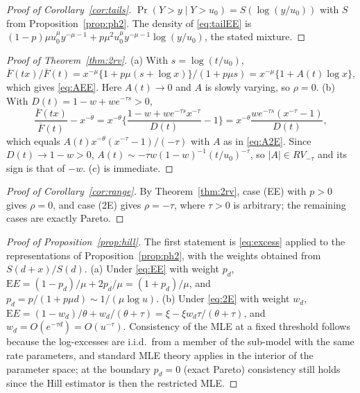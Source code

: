 \documentclass[12pt]{article}
\theoremstyle{definition}
\theoremstyle{remark}
\newcommand{\bF}{\overline{F}}
\newcommand{\E}{\mathrm{E}}
\begin{document}
\begin{proof}[Proof of Corollary~\ref{cor:tails}]
$\Pr(Y>y\mid Y>u_0)=S(\log(y/u_0))$ with $S$ from Proposition~\ref{prop:ph2}. The density of \eqref{eq:tailEE} is $(1-p)\mu u_0^{\mu}y^{-\mu-1}+p\mu^2u_0^{\mu}y^{-\mu-1}\log(y/u_0)$, the stated mixture.
\end{proof}

\begin{proof}[Proof of Theorem~\ref{thm:2rv}]
(a) With $s=\log(t/u_0)$, $\bF(tx)/\bF(t)=x^{-\mu}\{1+p\mu(s+\log x)\}/(1+p\mu s)=x^{-\mu}\{1+A(t)\log x\}$, which gives \eqref{eq:AEE}. Here $A(t)\to0$ and $A$ is slowly varying, so $\rho=0$.
(b) With $D(t)=1-w+we^{-\tau s}>0$,
\[
\frac{\bF(tx)}{\bF(t)}-x^{-\theta}=x^{-\theta}\Big\{\frac{1-w+we^{-\tau s}x^{-\tau}}{D(t)}-1\Big\}=x^{-\theta}\frac{we^{-\tau s}(x^{-\tau}-1)}{D(t)},
\]
which equals $A(t)x^{-\theta}(x^{-\tau}-1)/(-\tau)$ with $A$ as in \eqref{eq:A2E}. Since $D(t)\to1-w>0$, $A(t)\sim-\tau w(1-w)^{-1}(t/u_0)^{-\tau}$, so $|A|\in RV_{-\tau}$ and its sign is that of $-w$.
(c) is immediate.
\end{proof}

\begin{proof}[Proof of Corollary~\ref{cor:range}]
By Theorem~\ref{thm:2rv}, case (EE) with $p>0$ gives $\rho=0$, and case (2E) gives $\rho=-\tau$, where $\tau>0$ is arbitrary; the remaining cases are exactly Pareto.
\end{proof}

\begin{proof}[Proof of Proposition~\ref{prop:hill}]
The first statement is \eqref{eq:excess} applied to the representations of Proposition~\ref{prop:ph2}, with the weights obtained from $S(d+x)/S(d)$. (a) Under \eqref{eq:EE} with weight $p_d$, $\E E=(1-p_d)/\mu+2p_d/\mu=(1+p_d)/\mu$, and $p_d=p/(1+p\mu d)\sim1/(\mu\log u)$. (b) Under \eqref{eq:2E} with weight $w_d$, $\E E=(1-w_d)/\theta+w_d/(\theta+\tau)=\xi-\xi w_d\tau/(\theta+\tau)$, and $w_d=O(e^{-\tau d})=O(u^{-\tau})$. Consistency of the MLE at a fixed threshold follows because the log-excesses are i.i.d.\ from a member of the sub-model with the same rate parameters, and standard MLE theory applies in the interior of the parameter space; at the boundary $p_d=0$ (exact Pareto) consistency still holds since the Hill estimator is then the restricted MLE.
\end{proof}
\end{document}
